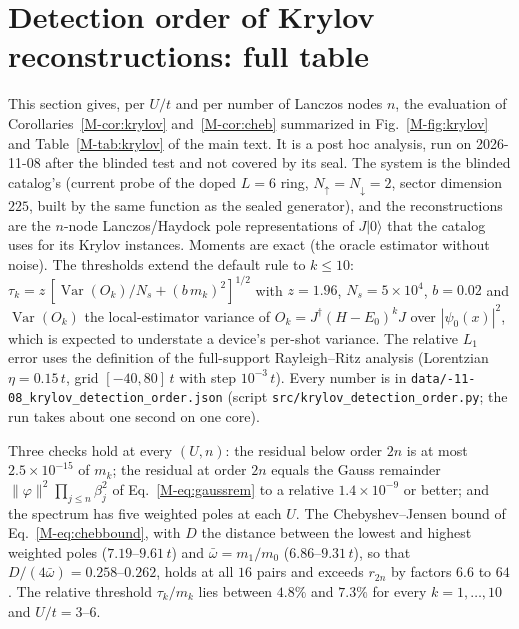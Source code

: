 \documentclass[aps,prb,onecolumn,superscriptaddress,longbibliography,floatfix]{revtex4-2}
\begin{document}
\section{Detection order of Krylov reconstructions: full table}
\label{app:krylov}
This section gives, per $U/t$ and per number of Lanczos nodes $n$, the evaluation of Corollaries~\ref{M-cor:krylov} and~\ref{M-cor:cheb} summarized in Fig.~\ref{M-fig:krylov} and Table~\ref{M-tab:krylov} of the main text. It is a post hoc analysis, run on 2026-11-08 after the blinded test and not covered by its seal. The system is the blinded catalog's (current probe of the doped $L=6$ ring, $N_\uparrow=N_\downarrow=2$, sector dimension $225$, built by the same function as the sealed generator), and the reconstructions are the $n$-node Lanczos/Haydock pole representations of $J|0\rangle$ that the catalog uses for its Krylov instances. Moments are exact (the oracle estimator without noise). The thresholds extend the default rule to $k\le10$: $\tau_k=z\,[\operatorname{Var}(O_k)/N_s+(b\,m_k)^2]^{1/2}$ with $z=1.96$, $N_s=5\times10^4$, $b=0.02$ and $\operatorname{Var}(O_k)$ the local-estimator variance of $O_k=J^\dagger(H-E_0)^kJ$ over $|\psi_0(x)|^2$, which is expected to understate a device's per-shot variance. The relative $L_1$ error uses the definition of the full-support Rayleigh--Ritz analysis (Lorentzian $\eta=0.15\,t$, grid $[-40,80]\,t$ with step $10^{-3}\,t$). Every number is in \texttt{data/-11-08\_krylov\_detection\_order.json} (script \texttt{src/\allowbreak krylov\_detection\_order.py}; the run takes about one second on one core).

Three checks hold at every $(U,n)$: the residual below order $2n$ is at most $2.5\times10^{-15}$ of $m_k$; the residual at order $2n$ equals the Gauss remainder $\|\varphi\|^2\prod_{j\le n}\beta_j^2$ of Eq.~\eqref{M-eq:gaussrem} to a relative $1.4\times10^{-9}$ or better; and the spectrum has five weighted poles at each $U$. The Chebyshev--Jensen bound of Eq.~\eqref{M-eq:chebbound}, with $D$ the distance between the lowest and highest weighted poles ($7.19$--$9.61\,t$) and $\bar\omega=m_1/m_0$ ($6.86$--$9.31\,t$), so that $D/(4\bar\omega)=0.258$--$0.262$, holds at all $16$ pairs and exceeds $r_{2n}$ by factors $6.6$ to $64$. The relative threshold $\tau_k/m_k$ lies between $4.8\%$ and $7.3\%$ for every $k=1,\dots,10$ and $U/t=3$--$6$.
\end{document}
